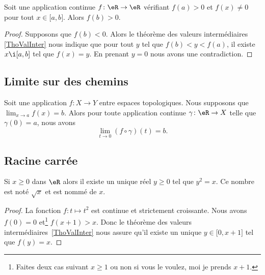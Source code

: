 \begin{corollary}	\label{CORooQXHDooWjSiKm}
	Soit une application continue \(f \colon \eR\to \eR  \) vérifiant \( f(a)>0\) et \( f(x)\neq 0\) pour tout \( x\in \mathopen[ a,b\mathclose]\). Alors \( f(b)>0\).
\end{corollary}

\begin{proof}
	Supposons que \( f(b)<0\). Alors le théorème des valeurs intermédiaires \ref{ThoValInter} nous indique que pour tout \( y\) tel que \( f(b)<y<f(a)\), il existe \( x\i \mathopen[ a,b\mathclose]\) tel que \( f(x)=y\). En prenant \( y=0\) nous avons une contradiction.
\end{proof}

\subsection{Limite sur des chemins}

\begin{proposition}		\label{PROPooREUUooUNDFRi}
	Soit une application \(f \colon X\to Y  \) entre espaces topologiques. Nous supposons que \( \lim_{x\to a}f(x)=b\). Alors pour toute application continue \(\gamma \colon \eR\to X  \) telle que \( \gamma(0)=a\), nous avons
	\begin{equation}
		\lim_{t\to 0}(f\circ\gamma)(t)=b.
	\end{equation}
\end{proposition}

\subsection{Racine carrée}


\begin{corollaryDef}     \label{DEFooGQTYooORuvQb}
	Si \( x\geq 0\) dans \( \eR\) alors il existe un unique réel \( y\geq 0\) tel que \( y^2=x\). Ce nombre est noté \( \sqrt{x}\) et est nommé  de \( x\).
\end{corollaryDef}

\begin{proof}
	La fonction \( f\colon t\mapsto t^2\) est continue et strictement croissante. Nous avons \( f(0)=0\) et\footnote{Faites deux cas suivant \( x\geq 1\) ou non si vous le voulez, moi je prends \( x+1\).} \( f(x+1)>x\). Donc le théorème des valeurs intermédiaires~\ref{ThoValInter} nous assure qu'il existe un unique \( y\in\mathopen[ 0 , x+1 \mathclose]\) tel que \( f(y)=x\).
\end{proof}

